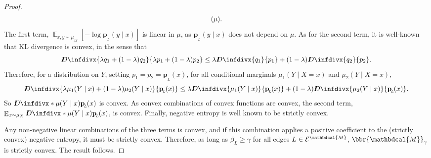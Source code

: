 \documentclass{article}
\theoremstyle{plain}
\theoremstyle{definition}
\theoremstyle{remark}
\newcommand{\thickD}{I\mkern-8muD}
\newcommand{\kldiv}{\thickD\infdivx}
\let\H\relax
\DeclareMathOperator{\H}{\mathrm{H}} %
\DeclareMathOperator*{\E}{\mathbb{E}} %
\newcommand\mat[1]{\mathbf{#1}}
\newcommand{\bp}[1][L]{\mat{p}_{\!_{#1}\!}}
\newcommand{\Ed}{\mathcal E}
\newcommand{\dg}[1]{\mathbdcal{#1}}
\numberwithin{equation}{section}
\begin{document}
\begin{proof}
\begin{align*}
                                \H(\mu). 
	\end{align*}
	The first term, 
	\( \E_{x,y \sim \mu_{\!_{XY}}} \left[-\log {\bp(y\mid x)}\right] \) 
	is linear in $\mu$, as $\bp(y\mid x)$ does not depend on $\mu$. %
As for the second term, it is well-known that KL divergence is convex, in the sense that 
	\[ \kldiv{\lambda q_1 + (1-\lambda) q_2 }{ \lambda p_1 +
          (1-\lambda) p_2} \leq \lambda \kldiv {q_1}{ p_1} +
                (1-\lambda) \kldiv{q_2}{p_2}. \] 
	Therefore, for a distribution on $Y$, setting $p_1 =
 p_2 = \bp(x)$, for all conditional marginals $\mu_1(Y \mid X=x)$ and
			$\mu_2(Y\mid X=x)$,
	\[ \kldiv{\lambda \mu_1(Y\mid x) + (1-\lambda)
			  \mu_2(Y\mid x) }{ \bp(x) } \leq \lambda \kldiv
			   {\mu_1(Y\mid x)}{\bp(x)} + (1-\lambda)
								  \kldiv{\mu_2(Y\mid x)}{\bp(x)}. \] 
	So $\kldiv*{\mu(Y\mid x)}{\bp( x)}$ is convex. As
			convex combinations of convex functions are convex,
			the second term, $\E_{x\sim\mu_X}\kldiv*{\mu(Y\mid
			  x)}{\bp( x)}$, is convex.
Finally, negative entropy is well known to be strictly convex.                

			Any non-negative linear combinations of the three
			terms is convex, and if this combination applies a
			positive coefficient to the (strictly convex) negative entropy,
			it must be strictly convex. Therefore, as
			long as $\beta_L \geq \gamma$ for all edges $L \in
			\Ed^{\dg M}$, $\bbr{\dg M}_\gamma$ is
strictly convex.  The result follows.
\end{proof}
\end{document}
